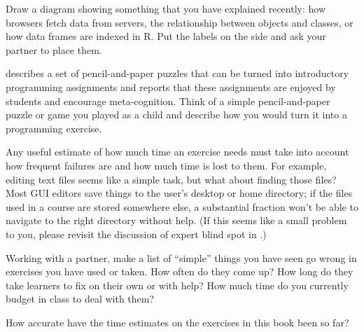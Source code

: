 
Draw a diagram showing something that you have explained recently:
how browsers fetch data from servers,
the relationship between objects and classes,
or how data frames are indexed in R.
Put the labels on the side and ask your partner to place them.


\cite{Butl2017} describes a set of pencil-and-paper puzzles
that can be turned into introductory programming assignments
and reports that these assignments are enjoyed by students and encourage meta-cognition.
Think of a simple pencil-and-paper puzzle or game you played as a child
and describe how you would turn it into a programming exercise.


Any useful estimate of how much time an exercise needs
must take into account how frequent failures are
and how much time is lost to them.
For example,
editing text files seems like a simple task,
but what about finding those files?
Most GUI editors save things to the user's desktop or home directory;
if the files used in a course are stored somewhere else,
a substantial fraction won't be able to navigate to the right directory without help.
(If this seems like a small problem to you,
please revisit the discussion of expert blind spot in .)

Working with a partner,
make a list of ``simple'' things you have seen go wrong in exercises you have used or taken.
How often do they come up?
How long do they take learners to fix on their own or with help?
How much time do you currently budget in class to deal with them?


How accurate have the time estimates on the exercises in this book been so far?

